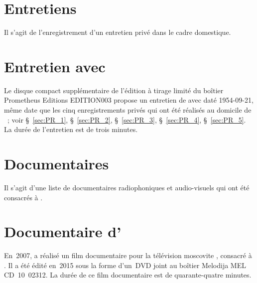 \begin{workitemize}
 \item{}
 \begin{perfitemize}
  \item{}
 \end{perfitemize}
\end{workitemize}

\section*{Entretiens}

Il s'agit de l'enregistrement d'un entretien privé dans le cadre domestique.

\section[%
Entretien avec Pavel Lobanov]{%
Entretien avec \PLobanov{}}

Le disque compact supplémentaire de l'édition à tirage limité du boîtier
Prometheus Editions EDITION003 propose un entretien de \VSofronitsky{} avec
\PLobanov{} daté 1954-09-21, même date que les cinq enregistrements privés
qui ont été réalisés au domicile de \VSofronitsky{}~; voir
\S{}~\ref{sec:PR_1}, \S{}~\ref{sec:PR_2}, \S{}~\ref{sec:PR_3},
\S{}~\ref{sec:PR_4}, \S{}~\ref{sec:PR_5}.
La durée de l'entretien est de trois minutes.

\section*{Documentaires}

Il s'agit d'une liste de documentaires radiophoniques et audio-visuels qui
ont été consacrés à \VSofronitsky{}.

\section[%
Documentaire d'Andrej Končalovskij]{%
Documentaire d'\AKonchalovsky{}}

En~2007, \AKonchalovsky{} a réalisé un film documentaire pour la télévision
moscovite \citep[voir][]{Konchalovsky07}, consacré à \VSofronitsky{}.
Il a été édité en~2015 sous la forme d'un~DVD joint au boîtier Melodija MEL
CD~10~02312.
La durée de ce film documentaire est de quarante-quatre minutes.

